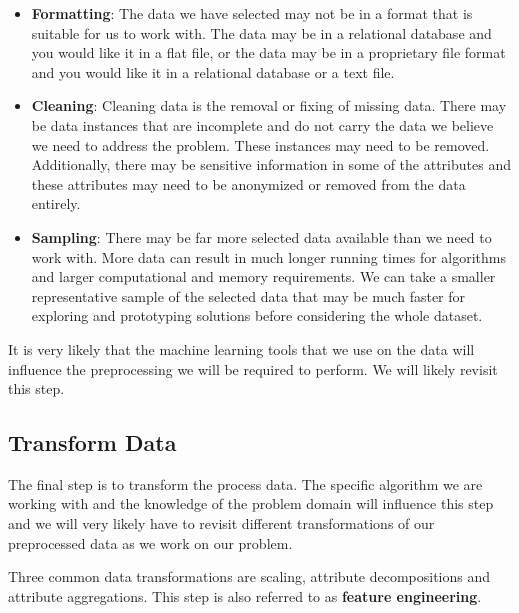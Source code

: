 \documentclass[11pt]{article}
\begin{document}
    \begin{itemize}
        \item \textbf{Formatting}: The data we have selected may not be in a format that is suitable for us to work with.
        The data may be in a relational database and you would like it in a flat file, or the data may be in a proprietary file format and you would like it in a relational database or a text file.

        \item \textbf{Cleaning}: Cleaning data is the removal or fixing of missing data.
        There may be data instances that are incomplete and do not carry the data we believe we need to address the problem.
        These instances may need to be removed.
        Additionally, there may be sensitive information in some of the attributes and these attributes may need to be anonymized or removed from the data entirely.

        \item \textbf{Sampling}: There may be far more selected data available than we need to work with.
        More data can result in much longer running times for algorithms and larger computational and memory requirements.
        We can take a smaller representative sample of the selected data that may be much faster for exploring and prototyping solutions before considering the whole dataset.

    \end{itemize}

    It is very likely that the machine learning tools that we use on the data will influence the preprocessing we will be required to perform.
    We will likely revisit this step.

    \subsection{Transform Data} \label{subsec:trans_data}

    The final step is to transform the process data.
    The specific algorithm we are working with and the knowledge of the problem domain will influence this step and we will very likely have to revisit different transformations of our preprocessed data as we work on our problem.

    Three common data transformations are scaling, attribute decompositions and attribute aggregations.
    This step is also referred to as \textbf{feature engineering}.
\end{document}
